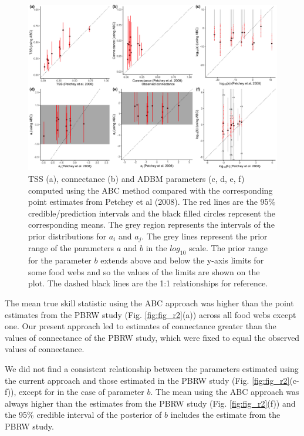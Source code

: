 \documentclass{article}
\begin{document}
\begin{figure}

{\centering \includegraphics[width=500px]{fig/ABC_vs_point_estimates} 

}

\caption{\label{fig:fig_r2} TSS (a), connectance (b) and ADBM parameters (c, d, e, f) computed using the ABC method compared with the corresponding point estimates from Petchey et al (2008). The red lines are the 95\% credible/prediction intervals and the black filled circles represent the corresponding means. The grey region represents the intervals of the prior distributions for $a_i$ and $a_j$. The grey lines represent the prior range of the parameters $a$ and $b$ in the $log_{10}$ scale. The prior range for the parameter $b$ extends above and below the y-axis limits for some food webs and so the values of the limits are shown on the plot. The dashed black lines are the 1:1 relationships for reference.}\label{fig:unnamed-chunk-7}
\end{figure}

The mean true skill statistic using the ABC approach was higher than the
point estimates from the PBRW study (Fig. \ref{fig:fig_r2}(a)) across
all food webs except one. Our present approach led to estimates of
connectance greater than the values of connectance of the PBRW study,
which were fixed to equal the observed values of connectance.

We did not find a consistent relationship between the parameters
estimated using the current approach and those estimated in the PBRW
study (Fig. \ref{fig:fig_r2}(c-f)), except for in the case of parameter
\(b\). The mean using the ABC approach was always higher than the
estimates from the PBRW study (Fig. \ref{fig:fig_r2}(f)) and the 95\%
credible interval of the posterior of \(b\) includes the estimate from
the PBRW study.
\end{document}
